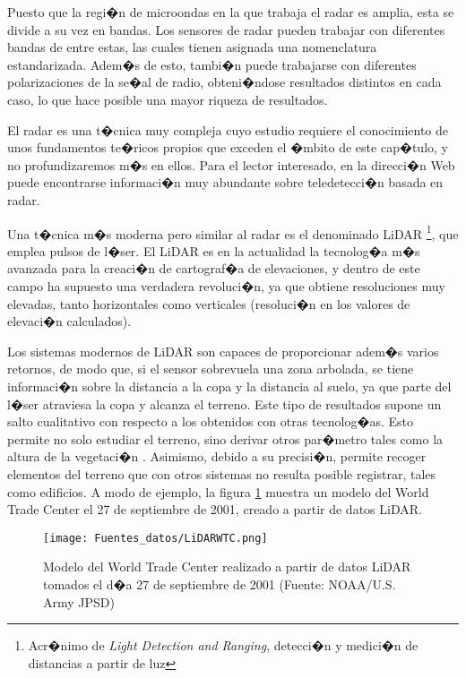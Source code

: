 Puesto que la regi�n de microondas en la que trabaja el radar es amplia, esta se divide a su vez en bandas. Los sensores de radar pueden trabajar con diferentes bandas de entre estas, las cuales tienen asignada una nomenclatura estandarizada. Adem�s de esto, tambi�n puede trabajarse con diferentes polarizaciones de la se�al de radio, obteni�ndose resultados distintos en cada caso, lo que hace posible una mayor riqueza de resultados. 

El radar es una t�cnica muy compleja cuyo estudio requiere el conocimiento de unos fundamentos te�ricos propios que exceden el �mbito de este cap�tulo, y no profundizaremos m�s en ellos. Para el lector interesado,	en la direcci�n Web \cite{webRadarCanada} puede encontrarse informaci�n muy abundante sobre teledetecci�n basada en radar.

Una t�cnica m�s moderna pero similar al radar es el denominado LiDAR \footnote{Acr�nimo de \emph{Light Detection and Ranging}, detecci�n y medici�n de distancias a partir de luz}, que emplea pulsos de l�ser. El LiDAR es en la actualidad la tecnolog�a m�s avanzada para la creaci�n de cartograf�a de elevaciones, y dentro de este campo ha supuesto una verdadera revoluci�n, ya que obtiene resoluciones muy elevadas, tanto horizontales como verticales (resoluci�n en los valores de elevaci�n calculados).

Los sistemas modernos de LiDAR son capaces de proporcionar adem�s varios retornos, de modo que, si el sensor sobrevuela una zona arbolada, se tiene informaci�n sobre la distancia a la copa y la distancia al suelo, ya que parte del l�ser atraviesa la copa y alcanza el terreno. Este tipo de resultados supone un salto cualitativo con respecto a los obtenidos con otras tecnolog�as. Esto permite no solo estudiar el terreno, sino derivar otros par�metro tales como la altura de la vegetaci�n \cite{Andersen2001PrecForestry}. Asimismo, debido a su precisi�n, permite recoger elementos del terreno que con otros sistemas no resulta posible registrar, tales como edificios. A modo de ejemplo, la figura \ref{Fig:LiDARWTC} muestra un modelo del World Trade Center el 27 de septiembre de 2001, creado a partir de datos LiDAR. 

\begin{figure}[!hbt]   
\centering
\texttt{[image: Fuentes\_datos/LiDARWTC.png]}
\caption{\small Modelo del World Trade Center realizado a partir de datos LiDAR tomados el d�a 27 de septiembre de 2001 (Fuente: NOAA/U.S. Army JPSD)}
\label{Fig:LiDARWTC} 
\end{figure}

